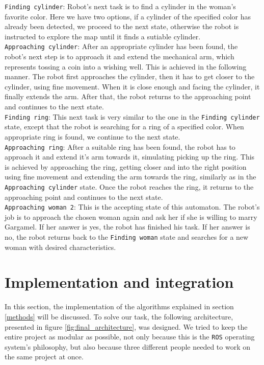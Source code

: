 \documentclass[12pt,a4paper]{article}
\begin{document}
	\texttt{Finding cylinder}: Robot's next task is to find a cylinder in the woman's favorite color. Here we have two options, if a cylinder of the specified color has already been detected, we proceed to the next state, otherwise the robot is instructed to explore the map until it finds a sutiable cylinder. \\

	\texttt{Approaching cylinder}: After an appropriate cylinder has been found, the robot's next step is to approach it and extend the mechanical arm, which represents tossing a coin into a wishing well. This is achieved in the following manner. The robot first approaches the cylinder, then it has to get closer to the cylinder, using fine movement. When it is close enough and facing the cylinder, it finally extends the arm. After that, the robot returns to the approaching point and continues to the next state. \\

	\texttt{Finding ring}: This next task is very similar to the one in the \texttt{Finding cylinder} state, except that the robot is searching for a ring of a specified color. When appropriate ring is found, we continue to the next state. \\

	\texttt{Approaching ring}: After a suitable ring has been found, the robot has to approach it and extend it's arm towards it, simulating picking up the ring. This is achieved by approaching the ring, getting closer and into the right position using fine movement and extending the arm towards the ring, similarly as in the \texttt{Approaching cylinder} state. Once the robot reaches the ring, it returns to the approaching point and continues to the next state. \\

	\texttt{Approaching woman 2}: This is the accepting state of this automaton. The robot's job is to approach the chosen woman again and ask her if she is willing to marry Gargamel. If her answer is yes, the robot has finished his task. If her answer is no, the robot returns back to the \texttt{Finding woman} state and searches for a new woman with desired characteristics. \\
	
	\section{Implementation and integration}
	In this section, the implementation of the algorithms explained in section \ref{methods} will be discussed. To solve our task, the following architecture, presented in figure \ref{fig:final_architecture}, was designed. We tried to keep the entire project as modular as possible, not only because this is the \texttt{ROS} operating system's philosophy, but also because three different people needed to work on the same project at once. \\
	
\end{document}
